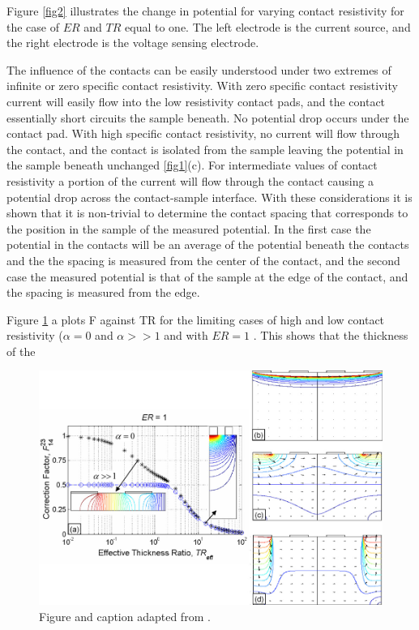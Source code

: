 Figure \ref{fig2} illustrates the change in potential for varying contact resistivity for the case of $ER$ and $TR$ equal to one. The left electrode is the current source, and the right electrode is the voltage sensing electrode. 

The influence of the contacts can be easily understood under two extremes of infinite or zero specific contact resistivity. With zero specific contact resistivity current will easily flow into the low resistivity contact pads, and the contact essentially short circuits the sample beneath. No potential drop occurs under the contact pad. With high specific contact resistivity, no current will flow through the contact, and the contact is isolated from the sample leaving the potential in the sample beneath unchanged \ref{fig1}(c). For intermediate values of contact resistivity a portion of the current will flow through the contact causing a potential drop across the contact-sample interface.
With these considerations it is shown that it is non-trivial  to determine the contact spacing that corresponds to the position in the sample of the measured potential. In the first case the potential in the contacts will be an average of the potential beneath the contacts \cite{Zimney2007CorrectionStudy} %
and the the spacing is measured from the center of the contact, and the second case the measured potential is that of the sample at the edge of the contact, and the spacing is measured from the edge.



Figure \ref{ER1} a plots F against TR for the limiting cases of high and low contact resistivity ($\alpha = 0$ and $\alpha >> 1$ and with $ER = 1$ . This shows that the thickness of the 


\begin{figure}[htb]
  \centering
    \includegraphics[width=\textwidth]{fig/4pp/ER1.png}
 \caption{  Figure and caption adapted from \cite{Zimney2007CorrectionStudy}.}
 \label{ER1}
\end{figure}


\cleardoublepage
